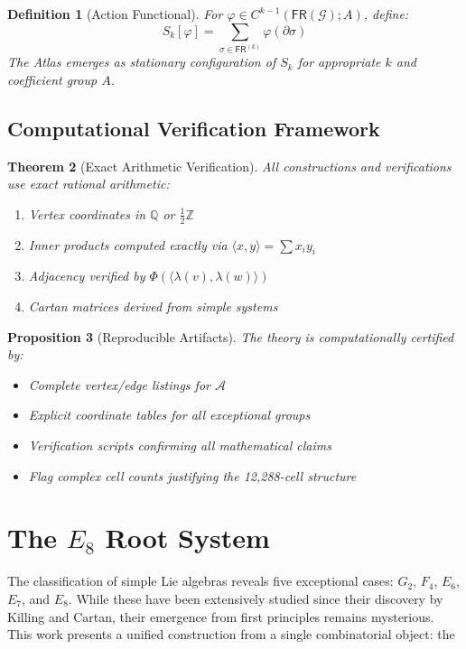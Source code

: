 \documentclass[12pt]{article}
\newtheorem{theorem}{Theorem}
\newtheorem{definition}[theorem]{Definition}
\newtheorem{proposition}[theorem]{Proposition}
\newcommand{\ZZ}{\mathbb{Z}}
\newcommand{\QQ}{\mathbb{Q}}
\newcommand{\A}{\mathcal{A}}
\newcommand{\G}{\mathcal{G}}
\newcommand{\PhiAdj}{\Phi}
\begin{document}
\begin{definition}[Action Functional]
For $\varphi \in C^{k-1}(\mathsf{FR}(\G); A)$, define:
\[
S_k[\varphi] = \sum_{\sigma \in \mathsf{FR}^{(k)}} \varphi(\partial \sigma)
\]
The Atlas emerges as stationary configuration of $S_k$ for appropriate $k$ and coefficient group $A$.
\end{definition}

\subsection{Computational Verification Framework}

\begin{theorem}[Exact Arithmetic Verification]
All constructions and verifications use exact rational arithmetic:
\begin{enumerate}
\item Vertex coordinates in $\QQ$ or $\frac12\ZZ$
\item Inner products computed exactly via $\langle x,y \rangle = \sum x_i y_i$
\item Adjacency verified by $\PhiAdj(\langle \lambda(v), \lambda(w) \rangle)$
\item Cartan matrices derived from simple systems
\end{enumerate}
\end{theorem}

\begin{proposition}[Reproducible Artifacts]
The theory is computationally certified by:
\begin{itemize}
\item Complete vertex/edge listings for $\A$
\item Explicit coordinate tables for all exceptional groups
\item Verification scripts confirming all mathematical claims
\item Flag complex cell counts justifying the 12,288-cell structure
\end{itemize}
\end{proposition}


\section{The $E_8$ Root System}

The classification of simple Lie algebras reveals five exceptional cases: $G_2$, $F_4$, $E_6$, $E_7$, and $E_8$. While these have been extensively studied since their discovery by Killing and Cartan, their emergence from first principles remains mysterious. This work presents a unified construction from a single combinatorial object: the 
\end{document}

